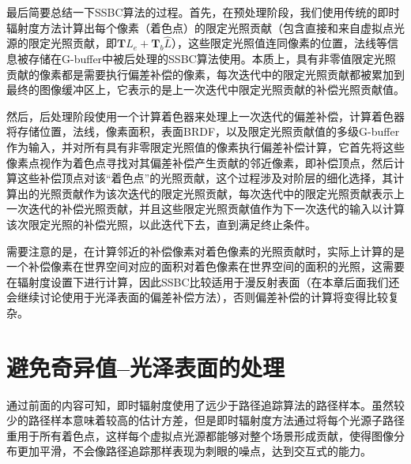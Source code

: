 最后简要总结一下SSBC算法的过程。首先，在预处理阶段，我们使用传统的即时辐射度方法计算出每个像素（着色点）的限定光照贡献（包含直接和来自虚拟点光源的限定光照贡献，即$\mathbf{T}L_e+\mathbf{T}_b\hat{L}$），这些限定光照值连同像素的位置，法线等信息被存储在G-buffer中被后处理的SSBC算法使用。本质上，具有非零值限定光照贡献的像素都是需要执行偏差补偿的像素，每次迭代中的限定光照贡献都被累加到最终的图像缓冲区上，它表示的是上一次迭代中限定光照贡献的补偿光照贡献值。

然后，后处理阶段使用一个计算着色器来处理上一次迭代的偏差补偿，计算着色器将存储位置，法线，像素面积，表面BRDF，以及限定光照贡献值的多级G-buffer作为输入，并对所有具有非零限定光照值的像素执行偏差补偿计算，它首先将这些像素点视作为着色点寻找对其偏差补偿产生贡献的邻近像素，即补偿顶点，然后计算这些补偿顶点对该“着色点”的光照贡献，这个过程涉及对阶层的细化选择，其计算出的光照贡献作为该次迭代的限定光照贡献，每次迭代中的限定光照贡献表示上一次迭代的补偿光照贡献，并且这些限定光照贡献值作为下一次迭代的输入以计算该次限定光照的补偿光照，以此迭代下去，直到满足终止条件。

需要注意的是，在计算邻近的补偿像素对着色像素的光照贡献时，实际上计算的是一个补偿像素在世界空间对应的面积对着色像素在世界空间的面积的光照，这需要在辐射度设置下进行计算，因此SSBC比较适用于漫反射表面（在本章后面我们还会继续讨论使用于光泽表面的偏差补偿方法），否则偏差补偿的计算将变得比较复杂。




\section{避免奇异值--光泽表面的处理}
通过前面的内容可知，即时辐射度使用了远少于路径追踪算法的路径样本。虽然较少的路径样本意味着较高的估计方差，但是即时辐射度方法通过将每个光源子路径重用于所有着色点，这样每个虚拟点光源都能够对整个场景形成贡献，使得图像分布更加平滑，不会像路径追踪那样表现为刺眼的噪点，达到交互式的能力。

